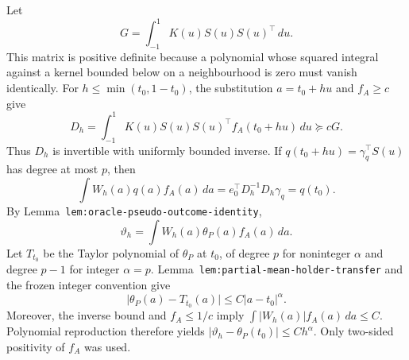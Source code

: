 Let
\[
G=\int_{-1}^1K(u)S(u)S(u)^\top\,du.
\]
This matrix is positive definite because a polynomial whose squared integral against a kernel bounded below on a neighbourhood is zero must vanish identically. For \(h\le\min(t_0,1-t_0)\), the substitution \(a=t_0+hu\) and \(f_A\ge c\) give
\[
D_h
=
\int_{-1}^1K(u)S(u)S(u)^\top f_A(t_0+hu)\,du
\succeq cG.
\]
Thus \(D_h\) is invertible with uniformly bounded inverse. If \(q(t_0+hu)=\gamma_q^\top S(u)\) has degree at most \(p\), then
\[
\int W_h(a)q(a)f_A(a)\,da
=e_0^\top D_h^{-1}D_h\gamma_q=q(t_0).
\]
By Lemma~\texttt{lem:oracle-pseudo-outcome-identity},
\[
\vartheta_h=\int W_h(a)\theta_P(a)f_A(a)\,da.
\]
Let \(T_{t_0}\) be the Taylor polynomial of \(\theta_P\) at \(t_0\), of degree \(p\) for noninteger \(\alpha\) and degree \(p-1\) for integer \(\alpha=p\). Lemma~\texttt{lem:partial-mean-holder-transfer} and the frozen integer convention give
\[
\lvert\theta_P(a)-T_{t_0}(a)\rvert\le C\lvert a-t_0\rvert^\alpha.
\]
Moreover, the inverse bound and \(f_A\le1/c\) imply \(\int|W_h(a)|f_A(a)\,da\le C\). Polynomial reproduction therefore yields \(\lvert\vartheta_h-\theta_P(t_0)\rvert\le Ch^\alpha\). Only two-sided positivity of \(f_A\) was used.